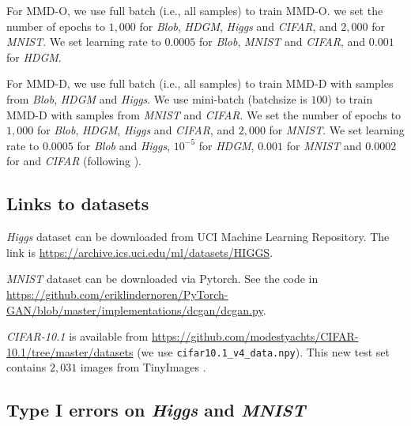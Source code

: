 \documentclass{article}
\begin{document}
For MMD-O, we use full batch (i.e., all samples) to train MMD-O. we set the number of epochs to $1,000$ for \emph{Blob}, \emph{HDGM}, \emph{Higgs} and \emph{CIFAR}, and $2,000$ for \emph{MNIST}. We set learning rate to $0.0005$ for \emph{Blob}, \emph{MNIST} and \emph{CIFAR}, and $0.001$ for \emph{HDGM}.

For MMD-D, we use full batch (i.e., all samples) to train MMD-D with samples from \emph{Blob}, \emph{HDGM} and \emph{Higgs}. We use mini-batch (batchsize is $100$) to train MMD-D with samples from \emph{MNIST} and \emph{CIFAR}. We set the number of epochs to $1,000$ for \emph{Blob}, \emph{HDGM}, \emph{Higgs} and \emph{CIFAR}, and $2,000$ for \emph{MNIST}. We set learning rate to $0.0005$ for \emph{Blob} and \emph{Higgs}, $10^{-5}$ for \emph{HDGM}, $0.001$ for \emph{MNIST} and $0.0002$ for and \emph{CIFAR} (following \citet{DCGAN_Radford}). 


\subsection{Links to datasets}
\emph{Higgs} dataset can be downloaded from UCI Machine Learning Repository. The link is \url{https://archive.ics.uci.edu/ml/datasets/HIGGS}.

\emph{MNIST} dataset can be downloaded via Pytorch. See the code in \url{https://github.com/eriklindernoren/PyTorch-GAN/blob/master/implementations/dcgan/dcgan.py}.

\emph{CIFAR-10.1} is available from \url{https://github.com/modestyachts/CIFAR-10.1/tree/master/datasets} (we use \texttt{cifar10.1\_v4\_data.npy}). This new test set contains $2,031$ images from TinyImages \citep{torralba2008tinyimages}.






































\subsection{Type I errors on \emph{Higgs} and \emph{MNIST}} \label{sec:typeI}
\end{document}
